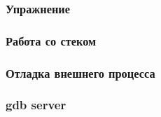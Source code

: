 \begin{frame}
  \frametitle{Упражнение}
\end{frame}

\begin{frame}
  \frametitle{Работа со стеком}
\end{frame}

\begin{frame}
 \frametitle{Отладка внешнего процесса}
\end{frame}

\begin{frame}
 \frametitle{gdb server}
\end{frame}


